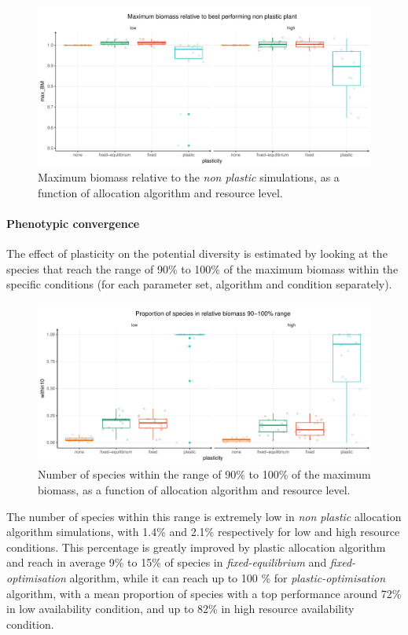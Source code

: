\begin{figure}\label{fig:max_BM_pl}
\includegraphics[width = \textwidth]{./2_PP/Figures/Landscape/plot_maxBM_allocation.pdf}
\caption{Maximum biomass relative to the \textit{non plastic} simulations, as a function of allocation algorithm and resource level.}
\end{figure}

\paragraph{Phenotypic convergence}

The effect of plasticity on the potential diversity is estimated by looking at the species that reach the range of 90\% to 100\% of the maximum biomass within the specific conditions (for each parameter set, algorithm and condition separately).

\begin{figure}\label{fig:species_richness}
\includegraphics[width = \textwidth]{./2_PP/Figures/Landscape/plot_eveness.pdf}
\caption{Number of species within the range of 90\% to 100\% of the maximum biomass, as a function of allocation algorithm and resource level.}
\end{figure}

The number of species within this range is extremely low in \textit{non plastic} allocation algorithm simulations, with 1.4\% and 2.1\% respectively for low and high resource conditions. This percentage is greatly improved by plastic allocation algorithm and reach in average 9\% to 15\% of species in \textit{fixed-equilibrium} and \textit{fixed-optimisation} algorithm, while it can reach up to 100 \% for \textit{plastic-optimisation} algorithm, with a mean proportion of species with a top performance around 72\% in low availability condition, and up to 82\% in high resource availability condition.


